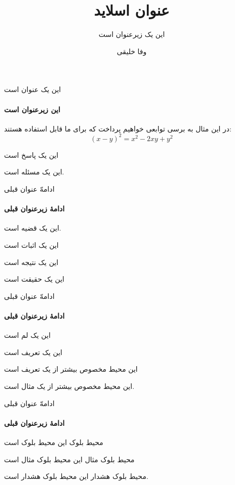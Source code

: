 \documentclass{beamer}
\title{عنوان اسلاید}
\subtitle{این یک زیرعنوان است}
\author{وفا خلیقی}
\institute{دانشگاه تهران}
\begin{document}
\begin{frame}
\titlepage
\end{frame}


\begin{frame}{این یک عنوان است}
\framesubtitle{این زیرعنوان است}
\begin{مثال}
در این مثال به برسی توابعی خواهیم پرداخت که برای ما قابل استفاده هستند:
\begin{equation}
(x-y)^2=x^2-2xy+y^2
\end{equation}
\end{مثال}
\begin{پاسخ}
این یک پاسخ است
\end{پاسخ}
\begin{مسئله}
این یک مسئله است.
\end{مسئله}
\end{frame}
\begin{frame}{ادامهّ عنوان قبلی}
\framesubtitle{ادامهٔ زیرعنوان قبلی}
\begin{قضیه}
این یک قضیه است.
\end{قضیه}
\begin{اثبات}
این یک اثبات است
\end{اثبات}
\begin{نتیجه}
این یک نتیجه است
\end{نتیجه}
\begin{حقیقت}
این یک حقیقت است
\end{حقیقت}
\end{frame}
\begin{frame}{ادامهّ عنوان قبلی}
\framesubtitle{ادامهٔ زیرعنوان قبلی}
\begin{لم}
این یک لم است
\end{لم}
\begin{تعریف}
این یک تعریف است
\end{تعریف}
\begin{تعریفها}
این محیط مخصوص بیشتر از یک تعریف است
\end{تعریفها}
\begin{مثالها}
این محیط مخصوص بیشتر از یک مثال است.
\end{مثالها}
\end{frame}
\begin{frame}{ادامهّ عنوان قبلی}
\framesubtitle{ادامهٔ زیرعنوان قبلی}
\begin{بلوک}{محیط بلوک}
این محیط بلوک است
\end{بلوک}
\begin{بلوک‌مثال}{محیط بلوک مثال}
این محیط بلوک مثال است
\end{بلوک‌مثال}
\begin{بلوک‌هشدار}{محیط بلوک هشدار}
این محیط بلوک هشدار است.
\end{بلوک‌هشدار}
\end{frame}
\end{document}
